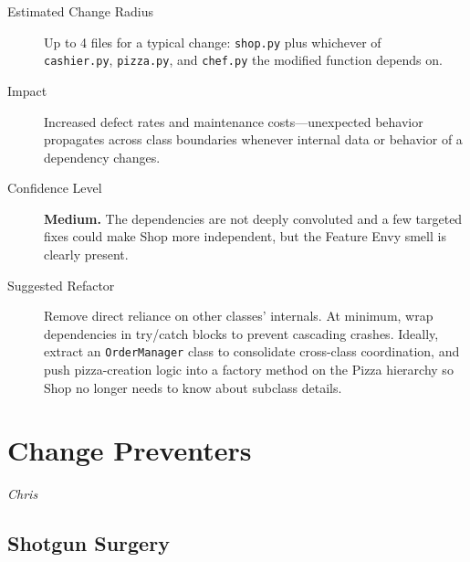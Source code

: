\documentclass[12pt]{article}
\begin{document}
\begin{description}
    \item[Estimated Change Radius]
        Up to 4 files for a typical change: \texttt{shop.py} plus whichever of \\
         \texttt{cashier.py}, \texttt{pizza.py}, and \texttt{chef.py} the modified function depends on.

    \item[Impact]
        Increased defect rates and maintenance costs---unexpected behavior propagates across class
        boundaries whenever internal data or behavior of a dependency changes.

    \item[Confidence Level]
        \textbf{Medium.} The dependencies are not deeply convoluted and a few targeted fixes could
        make Shop more independent, but the Feature Envy smell is clearly present.

    \item[Suggested Refactor]
        Remove direct reliance on other classes' internals. At minimum, wrap dependencies in
        try/catch blocks to prevent cascading crashes. Ideally, extract an \texttt{OrderManager}
        class to consolidate cross-class coordination, and push pizza-creation logic into a factory
        method on the Pizza hierarchy so Shop no longer needs to know about subclass details.
\end{description}

\section{Change Preventers}

\textit{Chris}

\subsection{Shotgun Surgery}
\end{document}
